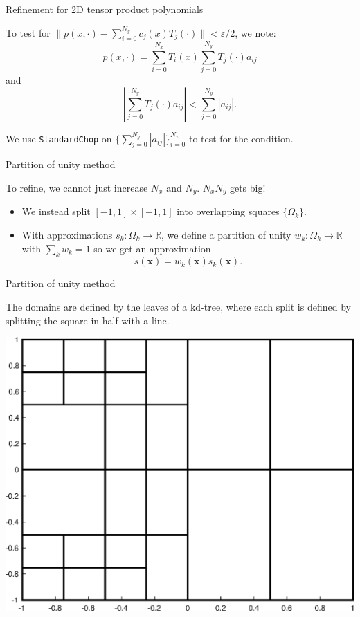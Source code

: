 \documentclass{beamer}
\newcommand{\R}{\mathbb{R}}
\newcommand{\vect}[1]{\mathbf{#1}}
\begin{document}
\begin{frame}{Refinement for 2D tensor product polynomials}
\begin{center}
To test for $\|p(x,\cdot) - \sum_{i=0}^{N_y} c_j(x)T_j(\cdot)\|<\varepsilon/2$, we note: $$p(x,\cdot)=\sum_{i=0}^{N_x} T_i(x) \sum_{j=0}^{N_y} T_j(\cdot)a_{ij}$$
and
$$ \left | \sum_{j=0}^{N_y} T_j(\cdot)a_{ij} \right | < \sum_{j=0}^{N_y} |a_{ij}|. $$
\end{center}

\begin{center}
We use {\tt StandardChop} on $\{ \sum_{j=0}^{N_y} |a_{ij}|  \}_{i=0}^{N_x}$ to test for the condition.
\end{center}
\end{frame}

\begin{frame}{Partition of unity method}
\begin{center}
To refine, we cannot just increase $N_x$ and $N_y$. $N_x N_y$ gets big!
\end{center}

\begin{itemize}
\item We instead split $[-1,1] \times [-1,1]$ into overlapping squares $\{ \Omega_k \}$.
\item With approximations $s_k:\Omega_k \to \R$, we define a partition of unity $w_k:\Omega_k \to \R$ with $\sum_k w_k=1$ so we get an approximation $$s(\vect{x}) = w_k(\vect{x})s_k(\vect{x}).$$
\end{itemize}

\end{frame}

\begin{frame}{Partition of unity method}
\begin{center}
The domains are defined by the leaves of a kd-tree, where each split is defined by splitting the square in half with a line.
\end{center}

\begin{center}
\includegraphics[scale = 0.4]{zonePlot.eps}
\end{center}
\end{frame}
\end{document}
